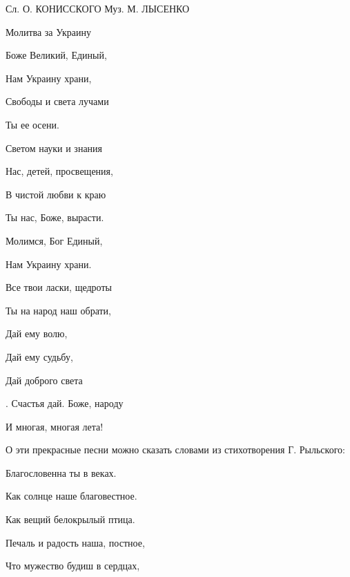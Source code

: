 Сл. О. КОНИССКОГО Муз. М. ЛЫСЕНКО



Молитва за Украину



Боже Великий, Единый,



Нам Украину храни,



Свободы и света лучами



Ты ее осени.



Светом науки и знания



Нас, детей, просвещения,



В чистой любви к краю



Ты нас, Боже, вырасти.



Молимся, Бог Единый,



Нам Украину храни.



Все твои ласки, щедроты



Ты на народ наш обрати,



Дай ему волю,



Дай ему судьбу,



Дай доброго света



. Счастья дай. Боже, народу



И многая, многая лета!



О эти прекрасные песни можно сказать словами из стихотворения Г. Рыльского:



Благословенна ты в веках.



Как солнце наше благовестное.



Как вещий белокрылый птица.



Печаль и радость наша, постное,



Что мужество будиш в сердцах,




